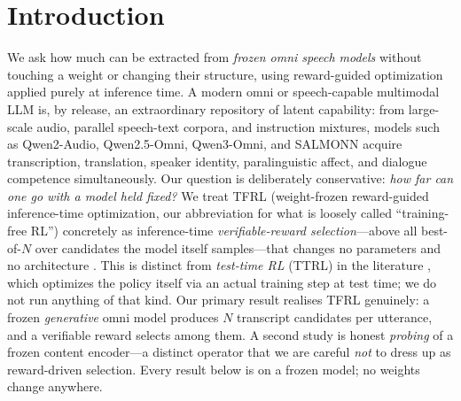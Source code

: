 \begin{abstract}
read-out configuration search (layer/pooling, not selection over model-sampled candidates) yields no significant emotion gain ($95\%$ CI $[-0.043,+0.116]$). On MInDS-14 tool/intent identification, a clean factorial separating instruction wording from candidate-card content shows the true zero-shot condition (instruction only, no examples) \emph{regresses} $-0.245$ ($95\%$ CI $[-0.286,-0.201]$) relative to a naive baseline; the previously reported gain was driven almost entirely by in-set example cards ($+0.246$), with the pure instruction-on-cards effect only $+0.015$---neither zero-shot nor a reward-guided-RL result. We state the caveats plainly: llama.cpp audio input is experimental upstream; snr5 is a robustness perturbation chosen for measurable headroom; the oracle uses the reference and is an upper bound, not deployable. All results are on frozen models with committed reproduction artifacts, internally re-verified by adversarial AI agents (not an independent team).
\end{abstract}

\section{Introduction}
\label{sec:intro}

We ask how much can be extracted from \emph{frozen omni speech models} without touching a weight or changing their structure, using reward-guided optimization applied purely at inference time. A modern omni or speech-capable multimodal LLM is, by release, an extraordinary repository of latent capability: from large-scale audio, parallel speech-text corpora, and instruction mixtures, models such as Qwen2-Audio, Qwen2.5-Omni, Qwen3-Omni, and SALMONN \citep{qwen2audio,qwen25omni,qwen3omni,salmonn2023} acquire transcription, translation, speaker identity, paralinguistic affect, and dialogue competence simultaneously. Our question is deliberately conservative: \emph{how far can one go with a model held fixed?} We treat TFRL (weight-frozen reward-guided inference-time optimization, our abbreviation for what is loosely called ``training-free RL'') concretely as inference-time \emph{verifiable-reward selection}---above all best-of-$N$ over candidates the model itself samples---that changes no parameters and no architecture \citep{beirami2024bon,mudgal2024controlled}. This is distinct from \emph{test-time RL} (TTRL) in the literature \citep{zuo2025ttrl}, which optimizes the policy itself via an actual training step at test time; we do not run anything of that kind. Our primary result realises TFRL genuinely: a frozen \emph{generative} omni model produces $N$ transcript candidates per utterance, and a verifiable reward selects among them. A second study is honest \emph{probing} of a frozen content encoder---a distinct operator that we are careful \emph{not} to dress up as reward-driven selection. Every result below is on a frozen model; no weights change anywhere.

